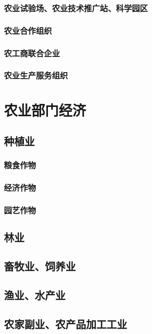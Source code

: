 \documentclass[UTF8]{../../RepresentationUniverse}
\begin{document}
    \subsubsection{农业试验场、农业技术推广站、科学园区}
    \subsubsection{农业合作组织}
    \subsubsection{农工商联合企业}
    \subsubsection{农业生产服务组织}
\section{农业部门经济}
    \subsection{种植业}
        \subsubsection{粮食作物}
        \subsubsection{经济作物}
        \subsubsection{园艺作物}
    \subsection{林业}
    \subsection{畜牧业、饲养业}
    \subsection{渔业、水产业}
    \subsection{农家副业、农产品加工工业}
\end{document}
